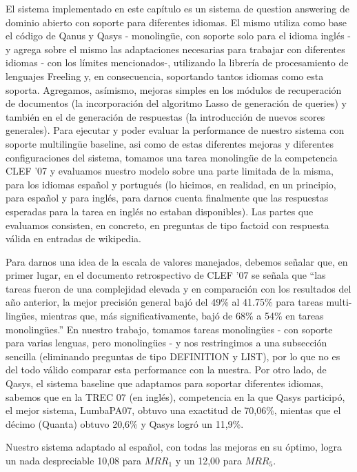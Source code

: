 El sistema implementado en este capítulo es un sistema de question answering de dominio abierto con soporte para diferentes idiomas. El mismo utiliza como base el código de Qanus y Qasys - monolingüe, con soporte solo para el idioma inglés - y agrega sobre el mismo las adaptaciones necesarias para trabajar con diferentes idiomas - con los límites mencionados-, utilizando la librería de procesamiento de lenguajes Freeling y, en consecuencia, soportando tantos idiomas como esta soporta. Agregamos, asímismo, mejoras simples en los módulos de recuperación de documentos (la incorporación del algoritmo Lasso de generación de queries) y también en el de generación de respuestas (la introducción de nuevos scores generales). Para ejecutar y poder evaluar la performance de nuestro sistema con soporte multilingüe baseline, asi como de estas diferentes mejoras y diferentes configuraciones del sistema, tomamos una tarea monolingüe de la competencia CLEF '07 y evaluamos nuestro modelo sobre una parte limitada de la misma, para los idiomas español y portugués (lo hicimos, en realidad, en un principio, para español y para inglés, para darnos cuenta finalmente que las respuestas esperadas para la tarea en inglés no estaban disponibles). Las partes que evaluamos consisten, en concreto, en preguntas de tipo factoid con respuesta válida en entradas de wikipedia.

Para darnos una idea de la escala de valores manejados, debemos señalar que, en primer lugar, en el documento retrospectivo de CLEF '07 se señala que ``las tareas fueron de una complejidad elevada y en comparación con los resultados del año anterior, la mejor precisión general bajó del 49\% al 41.75\% para tareas multi-lingües, mientras que, más significativamente, bajó de 68\% a 54\% en tareas monolingües.'' En nuestro trabajo, tomamos tareas monolingües - con soporte para varias lenguas, pero monolingües - y nos restringimos a una subsección sencilla (eliminando preguntas de tipo DEFINITION y LIST), por lo que no es del todo válido comparar esta performance con la nuestra. Por otro lado, de Qasys, el sistema baseline que adaptamos para soportar diferentes idiomas, sabemos que en la TREC 07 (en inglés), competencia en la que Qasys participó, el mejor sistema, LumbaPA07, obtuvo una exactitud de 70,06\%, mientas que el décimo (Quanta) obtuvo 20,6\% y Qasys logró un 11,9\%.

Nuestro sistema adaptado al español, con todas las mejoras en su óptimo, logra un nada despreciable 10,08 para $MRR_1$ y un 12,00 para $MRR_5$.

